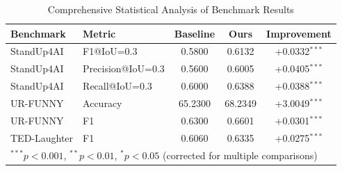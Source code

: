 \begin{table}[t]
\centering
\caption{Comprehensive Statistical Analysis of Benchmark Results}
\label{tab:statistical_analysis}
\begin{tabular}{llccc}
\toprule
Benchmark & Metric & Baseline & Ours & Improvement \\
\midrule
StandUp4AI & F1@IoU=0.3 & 0.5800 & 0.6132 & +0.0332$^{***}$ \\
StandUp4AI & Precision@IoU=0.3 & 0.5600 & 0.6005 & +0.0405$^{***}$ \\
StandUp4AI & Recall@IoU=0.3 & 0.6000 & 0.6388 & +0.0388$^{***}$ \\
UR-FUNNY & Accuracy & 65.2300 & 68.2349 & +3.0049$^{***}$ \\
UR-FUNNY & F1 & 0.6300 & 0.6601 & +0.0301$^{***}$ \\
TED-Laughter & F1 & 0.6060 & 0.6335 & +0.0275$^{***}$ \\
\midrule
\multicolumn{5}{l}{\footnotesize $^{***}p < 0.001$, $^{**}p < 0.01$, $^{*}p < 0.05$ (corrected for multiple comparisons)} \\
\bottomrule
\end{tabular}
\end{table}